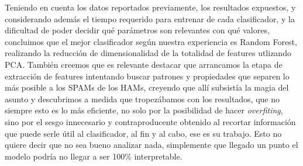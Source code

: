 Teniendo en cuenta los datos reportados previamente, los resultados expuestos, y considerando además el tiempo requerido para entrenar de cada clasificador, y la dificultad de poder decidir qué parámetros son relevantes con qué valores, concluimos que el mejor clasificador según nuestra experiencia es Random Forest, realizando la reducción de dimensionalidad de la totalidad de features utlizando PCA. 
También creemos que es relevante destacar que arrancamos la etapa de extracción de features intentando buscar patrones y propiedades que separen lo más posible a los SPAMs de los HAMs, creyendo que allí subsistía la magia del asunto y descubrimos a medida que tropezábamos con los resultados, que no siempre esto es lo más eficiente, no solo por la posibilidad de hacer \textit{overfiting}, sino por el sesgo innecesario y contraproducente obtenido al recortar información que puede serle útil al clasificador, al fin y al cabo, ese es su trabajo. Esto no quiere decir que no sea bueno analizar nada, simplemente que llegado un punto el modelo podría no llegar a ser 100\% interpretable.